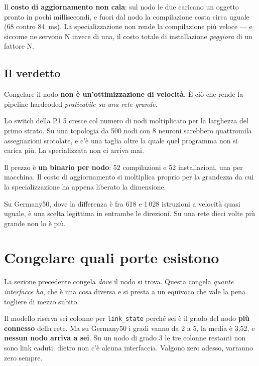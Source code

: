 \documentclass[11pt,a4paper,oneside]{report}
\begin{document}
Il \textbf{costo di aggiornamento non cala}: sul nodo le due caricano un
oggetto pronto in pochi millisecondi, e fuori dal nodo la compilazione costa
circa uguale (68 contro 84~ms). La specializzazione non rende la compilazione
più veloce --- e siccome ne servono N invece di una, il costo totale di
installazione \emph{peggiora} di un fattore N.

\subsection*{Il verdetto}

\begin{lezione}
Congelare il nodo \textbf{non è un'ottimizzazione di velocità}. È ciò che rende la
pipeline hardcoded \emph{praticabile su una rete grande}.

Lo switch della P1.5 cresce col numero di nodi moltiplicato per la larghezza del
primo strato. Su una topologia da 500 nodi con 8 neuroni sarebbero quattromila
assegnazioni srotolate, e c'è una taglia oltre la quale quel programma non si
carica più. La specializzata non ci arriva mai.

Il prezzo è \textbf{un binario per nodo}: 52 compilazioni e 52 installazioni,
una per macchina. Il costo di aggiornamento si moltiplica proprio per la
grandezza da cui la specializzazione ha appena liberato la dimensione.
\end{lezione}

Su Germany50, dove la differenza è fra 618 e 1\,028 istruzioni a velocità
quasi uguale, è una scelta legittima in entrambe le direzioni. Su una rete dieci
volte più grande non lo è più.

\section{Congelare quali porte esistono}

La sezione precedente congela \emph{dove} il nodo si trova. Questa congela
\emph{quante interfacce ha}, che è una cosa diversa e si presta a un equivoco
che vale la pena togliere di mezzo subito.

Il modello riserva sei colonne per \texttt{link\_state} perché sei è il grado
del nodo \textbf{più connesso} della rete. Ma su Germany50 i gradi vanno da 2 a
5, la media è 3,52, e \textbf{nessun nodo arriva a sei}. Su un nodo di grado 3
le tre colonne restanti non sono link caduti: dietro non c'è alcuna
interfaccia. Valgono zero adesso, varranno zero sempre.
\end{document}
